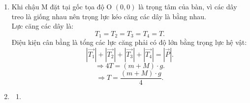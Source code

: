 
    \begin{enumerate}[label=(\alph*)]
    \item
    Khi chậu M đặt tại gốc tọa độ O $\left(0, 0\right)$ là trọng tâm của bàn, vì các dây treo là giống nhau nên trọng lực kéo căng các dây là bằng nhau.
    \\
    Lực căng các dây là:
    \begin{equation}
        T_1= T_2= T_3=T_4=T.
    \end{equation}
    Điệu kiện cân bằng là tổng các lực căng phải có độ lớn bằng trọng lực hệ vật:
    \begin{equation}
        |\vec{T_1}| + |\vec{T_2}| + |\vec{T_3}| +|\vec{T_4}| = |\vec{P}|.
    \end{equation}
    \begin{equation}    
        \Longrightarrow 4T = (m+M)\cdot g.
    \end{equation}
    \begin{equation}   
        \boxed{
        \Longrightarrow T = \dfrac{(m+M)\cdot g}{4}.
        }
    \end{equation}
    \item 
    \begin{enumerate}[label=(\roman*)]
    \item
        \begin{figure}[H]
    \centering

\begin{tikzpicture}[x=0.75pt,y=0.75pt,yscale=-1,xscale=1]


\end{tikzpicture}
\end{figure}
\end{enumerate}
\end{enumerate}
